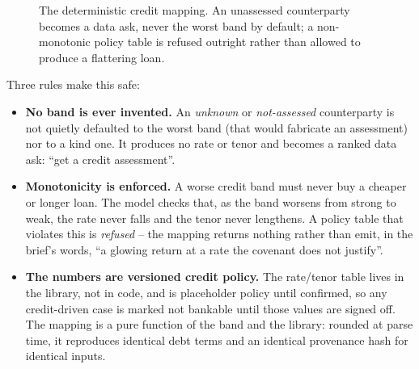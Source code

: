 \begin{figure}[H]
\centering
{}
\caption{The deterministic credit mapping. An unassessed counterparty becomes a data ask, never the worst band by default; a non-monotonic policy table is refused outright rather than allowed to produce a flattering loan.}
\label{fig:credit}
\end{figure}

Three rules make this safe:

\begin{itemize}
  \item \textbf{No band is ever invented.} An \emph{unknown} or \emph{not-assessed} counterparty is not quietly defaulted to the worst band (that would fabricate an assessment) nor to a kind one. It produces no rate or tenor and becomes a ranked data ask: ``get a credit assessment''.
  \item \textbf{Monotonicity is enforced.} A worse credit band must never buy a cheaper or longer loan. The model checks that, as the band worsens from strong to weak, the rate never falls and the tenor never lengthens. A policy table that violates this is \emph{refused} -- the mapping returns nothing rather than emit, in the brief's words, ``a glowing return at a rate the covenant does not justify''.
  \item \textbf{The numbers are versioned credit policy.} The rate/tenor table lives in the library, not in code, and is placeholder policy until confirmed, so any credit-driven case is marked not bankable until those values are signed off. The mapping is a pure function of the band and the library: rounded at parse time, it reproduces identical debt terms and an identical provenance hash for identical inputs.
\end{itemize}

